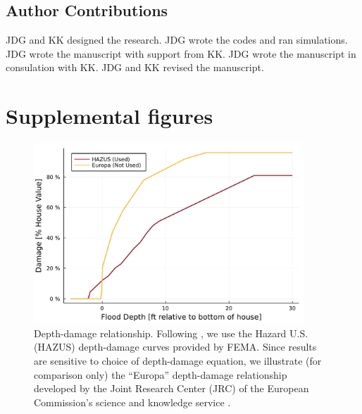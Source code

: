 \documentclass[12pt]{article}
\begin{document}
\subsection*{Author Contributions}

JDG and KK designed the research.
JDG wrote the codes and ran simulations.
JDG wrote the manuscript with support from KK.
JDG wrote the manuscript in consulation with KK.
JDG and KK revised the manuscript.

\printbibliography

\appendix
\newcommand{\hbAppendixPrefix}{S}
\renewcommand{\thefigure}{\hbAppendixPrefix\arabic{figure}}
\setcounter{figure}{0}
\renewcommand{\thetable}{\hbAppendixPrefix\arabic{table}}
\setcounter{table}{0}
\renewcommand{\theequation}{\hbAppendixPrefix\arabic{equation}}
\setcounter{equation}{0}

\newpage
\section{Supplemental figures}

\begin{figure}
    \centering
    \includegraphics[width=4in]{cost-depth-damage}
    \caption{
        Depth-damage relationship.
        Following \citet{zarekarizi_suboptimal:2020}, we use the Hazard U.S. (HAZUS) depth-damage curves provided by FEMA.
        Since results are sensitive to choice of depth-damage equation, we illustrate (for comparison only) the ``Europa'' depth-damage relationship developed by the Joint Research Center (JRC) of the European Commission's science and knowledge service \citep{huizinga_depthdamage:2016}.
    }\label{fig:cost-depth-damage}
\end{figure}
\end{document}
